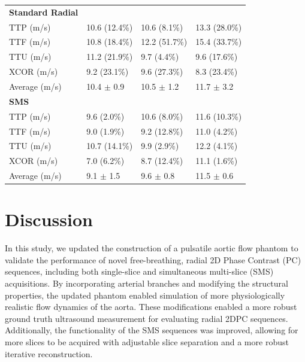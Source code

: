 \begin{table}[ht]
\begin{tabularx}{\textwidth}{lXXX}
    \midrule
    \textbf{Standard Radial} & \phantom{0} & \phantom{0} & \phantom{0} \\

    TTP (m/s)  & 10.6 (12.4\%) & 10.6 (\phantom{0}8.1\%) & 13.3 (28.0\%) \\
    TTF (m/s)  & 10.8 (18.4\%) & 12.2 (51.7\%) & 15.4 (33.7\%) \\
    TTU (m/s)  & 11.2 (21.9\%) & \phantom{0}9.7 (\phantom{0}4.4\%) & \phantom{0}9.6 (17.6\%) \\
    XCOR (m/s) & \phantom{0}9.2 (23.1\%) & \phantom{0}9.6 (27.3\%) & \phantom{0}8.3 (23.4\%) \\
    Average (m/s) & 10.4\phantom{0} $\pm$ \phantom{0}0.9 & 10.5\phantom{0} $\pm$ \phantom{0}1.2 & 11.7\phantom{0} $\pm$ \phantom{0}3.2 \\

    \midrule
    \textbf{SMS} & \phantom{0} & \phantom{0} & \phantom{0} \\

    TTP (m/s)  & \phantom{0}9.6 (\phantom{0}2.0\%) & 10.6 (\phantom{0}8.0\%) & 11.6 (10.3\%)\\
    TTF (m/s)  & \phantom{0}9.0 (\phantom{0}1.9\%) & \phantom{0}9.2 (12.8\%) & 11.0 (\phantom{0}4.2\%) \\
    TTU (m/s)  & 10.7 (14.1\%) & \phantom{0}9.9 (\phantom{0}2.9\%) & 12.2 (\phantom{0}4.1\%) \\
    XCOR (m/s) & \phantom{0}7.0 (\phantom{0}6.2\%) & \phantom{0}8.7 (12.4\%) & 11.1 (\phantom{0}1.6\%) \\
    Average (m/s) & \phantom{0}9.1\phantom{0} $\pm$ \phantom{0}1.5 & \phantom{0}9.6\phantom{0} $\pm$ \phantom{0}0.8 & 11.5\phantom{0} $\pm$ \phantom{0}0.6 \\

    \bottomrule
    \end{tabularx}
\end{table}

\section{Discussion}\label{sec:phantom_discussion}
In this study, we updated the construction of a pulsatile aortic flow phantom to validate the performance of novel free-breathing, radial 2D Phase Contrast (PC) sequences, including both single-slice and simultaneous multi-slice (SMS) acquisitions. By incorporating arterial branches and modifying the structural properties, the updated phantom enabled simulation of more physiologically realistic flow dynamics of the aorta. These modifications enabled a more robust ground truth ultrasound measurement for evaluating radial 2DPC sequences. Additionally, the functionality of the SMS sequences was improved, allowing for more slices to be acquired with adjustable slice separation and a more robust iterative reconstruction. 

